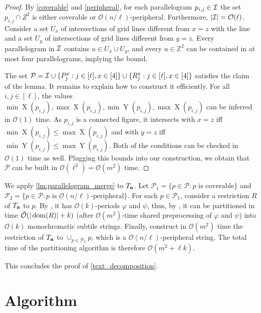 \documentclass[11pt, letterpaper]{article}
\theoremstyle{plain}
\theoremstyle{definition}
\theoremstyle{remark}
\newcommand{\Z}{\mathbb{Z}}
\renewcommand{\O}{\mathcal{O}}
\newcommand{\tO}{\tilde{\mathcal{O}}}
\renewcommand{\phi}{\varphi}
\DeclareMathOperator*{\X}{X}
\DeclareMathOperator*{\Y}{Y}
\begin{document}
\begin{proof}
By \cref{coverable} and \cref{peripheral}, for each parallelogram $p_{i,j} \in \mathcal{I}$ the set $p_{i,j} \cap Z^2$ is either coverable or $\O(n/\ell)$-peripheral. Furthermore, $|\I| = \O(\ell)$. Consider a set $U_x$ of intersections of grid lines different from $x=z$ with the line and a set $U_y$ of intersections of grid lines different from $y=z$. Every parallelogram in $\mathcal{I}$ contains $u \in U_x \cup U_y$, and every $u \in \Z^2$ can be contained in at most four parallelograms, implying the bound. 

The set $\mathcal{P} = \mathcal{I} \cup \{P_j^x : j \in [\ell], x \in [4]\} \cup \{R_j^x : j \in [\ell], x \in [4]\}$ satisfies the claim of the lemma. It remains to explain how to construct it efficiently. For all $i,j \in [\ell]$, the values $\min \X(p_{i,j}), \max \X(p_{i,j}), \min \Y(p_{i,j}), \max \X(p_{i,j})$ can be inferred in $\O(1)$ time. As $p_{i,j}$ is a connected figure, it intersects with $x = z$ iff $\min \X(p_{i,j}) \le \max \X(p_{i,j})$ and with $y = z$ iff $\min \Y(p_{i,j}) \le \max \Y(p_{i,j})$. Both of the conditions can be checked in $\O(1)$ time as well. Plugging this bounds into our construction, we obtain that $\mathcal{P}$ can be built in $\O(\ell^2) = \O(m^2)$ time. 
\end{proof}

We apply \cref{lm:parallelogram_merge} to $T_\mathbf{a}$. Let $\mathcal{P}_1 = \{p \in \mathcal{P} : p \text { is coverable}\}$ and $\mathcal{P}_2 = \{p \in \mathcal{P} : p \text { is }\O(n/\ell)\text{-peripheral}\}$. For each $p \in \mathcal{P}_1$, consider a restriction $R$ of $T_\mathbf{a}$ to $p$. By , it has $\O(k)$-periods $\phi$ and $\psi$, thus, by , it can be partitioned in time $\tO(|\d{R}| + k)$ (after $\O(m^2)$-time shared preprocessing of $\phi$ and $\psi$) into $\O(k)$ monochromatic subtile strings. Finally, construct in $\O(m^2)$ time the restriction of $T_\mathbf{a}$ to $\cup_{p \in \mathcal{P_2}} p$, which is a $\O(n / \ell)$-peripheral string. The total time of the partitioning algorithm is therefore $\O(m^2+\ell k)$.

This concludes the proof of \cref{text_decomposition}.

\section{Algorithm}
\label{sec:algorithm}
\end{document}
